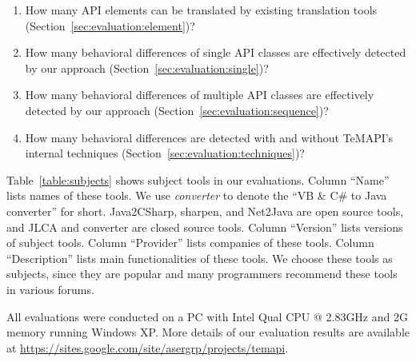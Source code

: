 \vspace*{-1.5ex}
\begin{enumerate}
\item How many API elements can be translated by existing translation tools (Section~\ref{sec:evaluation:element})? \vspace*{-1.8ex}
\item How many behavioral differences of single API classes are effectively detected by our approach (Section~\ref{sec:evaluation:single})?\vspace*{-1.8ex}
\item How many behavioral differences of multiple API classes are effectively detected by our approach (Section~\ref{sec:evaluation:sequence})?\vspace*{-1.8ex}
\item How many behavioral differences are detected with and without TeMAPI's internal techniques (Section~\ref{sec:evaluation:techniques})?
\end{enumerate}\vspace*{-1.5ex}

Table~\ref{table:subjects} shows subject tools in our evaluations. Column ``Name'' lists names of these tools. We use \emph{converter} to denote the ``VB \& C\# to Java converter'' for short. Java2CSharp, sharpen, and Net2Java are open source tools, and JLCA and converter are closed source tools. Column ``Version'' lists versions of subject tools. Column ``Provider'' lists companies of these tools. Column ``Description'' lists main functionalities of these tools. We choose these tools as subjects, since they are popular and many programmers recommend these tools in various forums.

All evaluations were conducted on a PC with Intel Qual CPU @ 2.83GHz and 2G memory running Windows XP. More details
of our evaluation results are available at \url{https://sites.google.com/site/asergrp/projects/temapi}.

